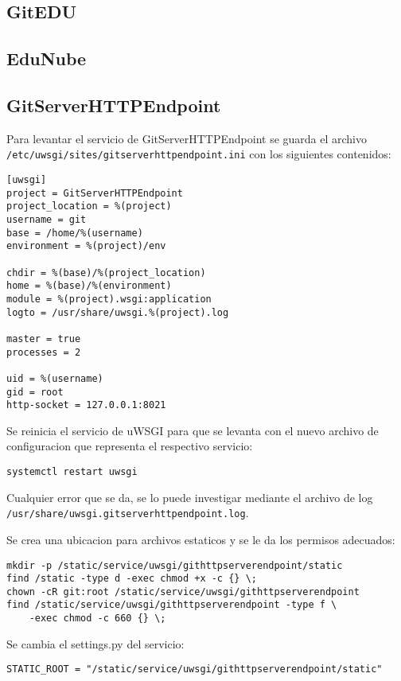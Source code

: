 \subsection{GitEDU}

\subsection{EduNube}

\subsection{GitServerHTTPEndpoint}
Para levantar el servicio de GitServerHTTPEndpoint se guarda el archivo \\ \texttt{/etc/uwsgi/sites/gitserverhttpendpoint.ini} con los siguientes contenidos:
\begin{lstlisting}
[uwsgi]
project = GitServerHTTPEndpoint
project_location = %(project)
username = git
base = /home/%(username)
environment = %(project)/env

chdir = %(base)/%(project_location)
home = %(base)/%(environment)
module = %(project).wsgi:application
logto = /usr/share/uwsgi.%(project).log

master = true
processes = 2

uid = %(username)
gid = root
http-socket = 127.0.0.1:8021
\end{lstlisting}

Se reinicia el servicio de uWSGI para que se levanta con el nuevo archivo de configuracion que representa el respectivo servicio:
\begin{lstlisting}
systemctl restart uwsgi
\end{lstlisting}
Cualquier error que se da, se lo puede investigar mediante el archivo de log \texttt{/usr/share/uwsgi.gitserverhttpendpoint.log}.

Se crea una ubicacion para archivos estaticos y se le da los permisos adecuados:
\begin{lstlisting}
mkdir -p /static/service/uwsgi/githttpserverendpoint/static
find /static -type d -exec chmod +x -c {} \;
chown -cR git:root /static/service/uwsgi/githttpserverendpoint
find /static/service/uwsgi/githttpserverendpoint -type f \
    -exec chmod -c 660 {} \;
\end{lstlisting}

Se cambia el settings.py del servicio:
\lstset{language=Python}
\begin{lstlisting}
STATIC_ROOT = "/static/service/uwsgi/githttpserverendpoint/static"
\end{lstlisting}
\lstset{language=Bash}

